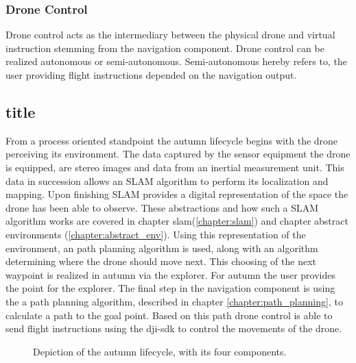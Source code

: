 \subsubsection{Drone Control}
Drone control acts as the intermediary between the physical drone and virtual instruction stemming from the navigation component. Drone control can be realized autonomous or semi-autonomous. Semi-autonomous hereby refers to, the user providing flight instructions depended on the navigation output.

\subsection{title}

From a process oriented standpoint the autumn lifecycle begins with the drone perceiving its environment. The data captured by the sensor equipment the drone is equipped, are stereo images and data from an inertial measurement unit. This data in succession allows an SLAM algorithm to perform its localization and mapping. Upon finishing SLAM provides a digital representation of the space the drone has been able to observe. These abstractions and how such a SLAM algorithm works are covered in chapter slam(\ref{chapter:slam}) and chapter abstract environments (\ref{chapter:abstract_env}). Using this representation of the environment, an path planning algorithm is used, along with an algorithm determining where the drone should move next. This choosing of the next waypoint is realized in autumn via the explorer. For autumn the user provides the point for the explorer. The final step in the navigation component is using the a path planning algorithm, described in chapter \ref{chapter:path_planning}, to calculate a path to the goal point. Based on this path drone control is able to send flight instructions using the dji-sdk to control the movements of the drone.

\begin{figure}
	\centering
	
	\caption{Depiction of the autumn lifecycle, with its four components.}
	\label{fig:autumnLifecycle}
\end{figure}




\filbreak